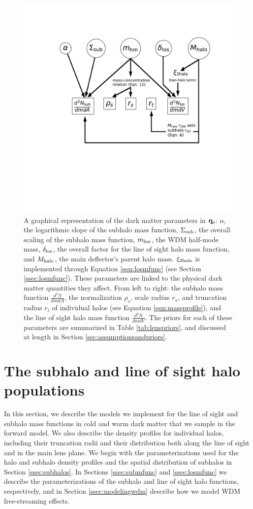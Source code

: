 \begin{figure}
	\centering
	\includegraphics[clip,trim=3.8cm 8cm 2.5cm
	4cm,width=.8\textwidth,keepaspectratio]{./figures_wdmchillsout/schematic.pdf}
	\caption{\label{fig:schematic} A graphical representation of the dark matter parameters in ${\bf{q}_{\rm{s}}}$: $\alpha$, the logarithmic slope of the subhalo mass function, $\Sigma_{\rm{sub}}$, the overall scaling of the subhalo mass function, ${m_{\rm{hm}}}$, the WDM half-mode mass, $\delta_{\rm{los}}$, the overall factor for the  line of sight halo mass function, and $M_{\rm{halo}}$, the main deflector's parent halo mass. $\xi_{\rm{2halo}}$ is implemented through Equation \ref{eqn:losmfunc} (see Section \ref{ssec:losmfunc}). These parameters are linked to the physical dark matter quantities they affect. From left to right: the subhalo mass function $\frac{d^2 N}{dm dA}$, the normalization $\rho_s$, scale radius $r_s$, and truncation radius $r_t$ of individual halos (see Equation \ref{eqn:massprofile}), and the line of sight halo mass function $\frac{d^2 N}{dm dV}$. The priors for each of these parameters are summarized in Table \ref{tab:lenspriors}, and discussed at length in Section \ref{sec:assumptionsandpriors}.}
\end{figure}	

\section{The subhalo and line of sight halo populations}
\label{sec:parameterizations}
In this section, we describe the models we implement for the line of sight and subhalo mass functions in cold and warm dark matter that we sample in the forward model. We also describe the density profiles for individual halos, including their truncation radii and their distribution both along the line of sight and in the main lens plane. We begin with the parameterizations used for the halo and subhalo density profiles and the spatial distribution of subhalos in Section \ref{ssec:subhalos}. In Sections \ref{ssec:submfunc} and \ref{ssec:losmfunc} we describe the parameterizations of the subhalo and line of sight halo functions, respectively, and in Section \ref{ssec:modelingwdm} describe how we model WDM free-streaming effects. 

